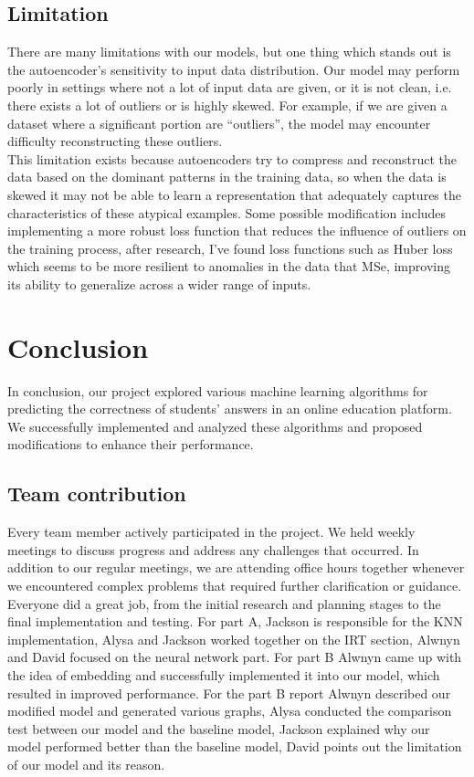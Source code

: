\documentclass{article}
\begin{document}
\subsection*{Limitation}
There are many limitations with our models, but one thing which stands out is the autoencoder's sensitivity to input data distribution. Our model may perform poorly in settings where not a lot of input data are given, or it is not clean, i.e. there exists a lot of outliers or is highly skewed. For example, if we are given a dataset where a significant portion are “outliers”, the model may encounter difficulty reconstructing these outliers. 
\\
This limitation exists because autoencoders try to compress and reconstruct the data based on the dominant patterns in the training data, so when the data is skewed it may not be able to learn a representation that adequately captures the characteristics of these atypical examples. 
Some possible modification includes implementing a more robust loss function that reduces the influence of outliers on the training process, after research, I’ve found loss functions such as Huber loss which seems to be more resilient to anomalies in the data that MSe, improving its ability to generalize across a wider range of inputs.



\section*{Conclusion}

In conclusion, our project explored various machine learning algorithms for predicting the correctness of students' answers in an online education platform. We successfully implemented and analyzed these algorithms and proposed modifications to enhance their performance. 

\subsection*{Team contribution}
Every team member actively participated in the project. We held weekly meetings to discuss progress and address any challenges that occurred. In addition to our regular meetings, we are attending office hours together whenever we encountered complex problems that required further clarification or guidance. Everyone did a great job, from the initial research and planning stages to the final implementation and testing. For part A, Jackson is responsible for the KNN implementation, Alysa and Jackson worked together on the IRT section, Alwnyn and David focused on the neural network part. For part B Alwnyn came up with the idea of embedding and successfully implemented it into our model, which resulted in improved performance. For the part B report Alwnyn described our modified model and generated various graphs, Alysa conducted the comparison test between our model and the baseline model, Jackson explained why our model performed better than the baseline model, David points out the limitation of our model and its reason.
\end{document}

